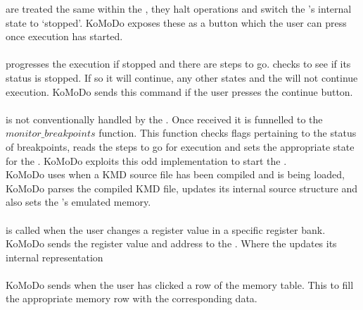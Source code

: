 %
 are treated the same within the , they halt operations and switch the 's internal state to `stopped'. KoMoDo exposes these as a button which the user can press once execution has started.\\\\
%
 progresses the execution if stopped and there are steps to go.  checks to see if its status is stopped. If so it will continue, any other states and the  will not continue execution. KoMoDo sends this command if the user presses the continue button.\\\\
%
 is not conventionally handled by the . Once received it is funnelled to the $monitor\_breakpoints$ function. This function checks flags pertaining to the status of breakpoints, reads the steps to go for execution and sets the appropriate state for the . KoMoDo exploits this odd implementation to start the .\\
%
%
%
%
KoMoDo uses  when a KMD source file has been compiled and is being loaded, KoMoDo parses the compiled KMD file, updates its internal source structure and also sets the 's emulated memory.\\\\
%
 is called when the user changes a register value in a specific register bank. KoMoDo sends the register value and address to the . Where the  updates its internal representation\\\\
%
KoMoDo sends  when the user has clicked a row of the memory table. This to fill the appropriate memory row with the corresponding data.\\\\
